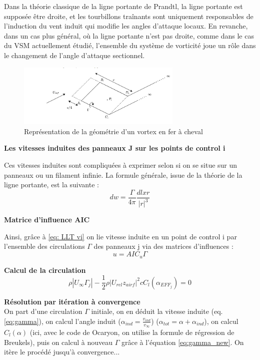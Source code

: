 Dans la théorie classique de la ligne portante de Prandtl, la ligne portante est supposée être droite, et les tourbillons traînants sont uniquement responsables de l'induction du vent induit qui modifie les angles d'attaque locaux. En revanche, dans un cas plus général, où la ligne portante n'est pas droite, comme dans le cas du VSM actuellement étudié, l'ensemble du système de vorticité joue un rôle dans le changement de l'angle d'attaque sectionnel.\\

\begin{figure}[H]
    \centering
    \includegraphics[width=0.7\textwidth]{Pics/01 - Basses Fidélités/Panneaux VSM.png}
    \caption{Représentation de la géométrie d'un vortex en fer à cheval}
    \label{fig:panneau vsm}
\end{figure}

\textbf{Les vitesses induites des panneaux J sur les points de control i}

Ces vitesses induites sont compliquées à exprimer selon si on se situe sur un panneaux ou un filament infinie. La formule générale, issue de la théorie de la ligne portante, est la suivante : 
\begin{equation}
    dw = \frac{\Gamma}{4 \pi} \frac{dl x r}{|r|^3}
    \label{eq: LLT vi}
\end{equation}

\textbf{Matrice d'influence AIC}

Ainsi, grâce à \ref{eq: LLT vi} on lie vitesse induite en un point de control i par l'ensemble des circulations $\Gamma$ des panneaux j via des matrices d'influences : 
\begin{equation}
    u = AIC_u \Gamma
    \label{eq:gamma}
\end{equation}

\textbf{Calcul de la circulation}
\begin{equation}
    \rho |U_{\infty} \Gamma_j| - \frac{1}{2} \rho |U_{rel} z_{airf}|^2 c C_l(\alpha_{EFF_j}) = 0
    \label{eq:gamma_new}
\end{equation}

\textbf{Résolution par itération à convergence}\\
On part d'une circulation $\Gamma$ initiale, on en déduit la vitesse induite (eq. \ref{eq:gamma}), on calcul l'angle induit ($\alpha_{ind} = \frac{v_{ind}}{v_{\infty}}$) ($\alpha_{tot} = \alpha + \alpha_{ind}$), on calcul $C_l(\alpha)$ (ici, avec le code de Ocaryon, on utilise la formule de régression de Breukels), puis on calcul à nouveau $\Gamma$ grâce à l'équation \ref{eq:gamma_new}. On itère le procédé jusqu'à convergence...\\

